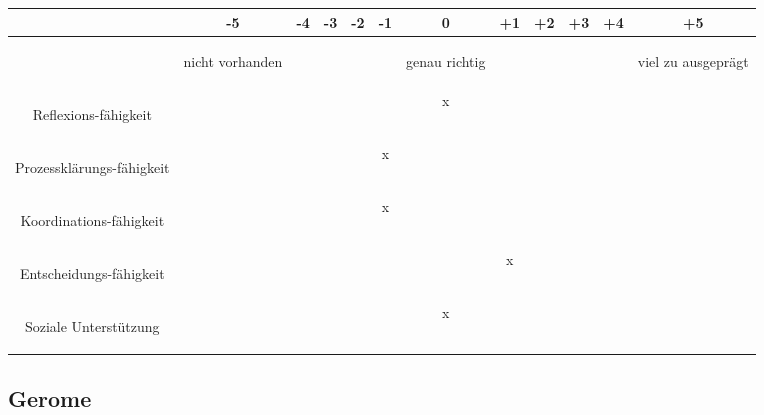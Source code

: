\begin{tabular}{C{\fabstand}|C{\abstand}|C{\abstand}|C{\abstand}|C{\abstand}|C{\abstand}|C{\abstand}|C{\abstand}|C{\abstand}|C{\abstand}|C{\abstand}|C{\abstand}|}
\hline
& -5 & -4 & -3 & -2 & -1 & 0 & +1 & +2 & +3 & +4 & +5\\
\hline
&\begin{tiny}nicht vorhanden \end{tiny}& & & & & \begin{tiny}genau richtig \end{tiny}& & & & & \begin{tiny}viel zu ausgeprägt\end{tiny}\\
\hline
\begin{tiny} Reflexions-fähigkeit \end{tiny} & & & & & & x & & & & & \\
\hline
\begin{tiny} Prozessklärungs-fähigkeit \end{tiny}& & & & & x & & & & & & \\
\hline
\begin{tiny} Koordinations-fähigkeit \end{tiny}& & & & & x & & & & & & \\
\hline
\begin{tiny} Entscheidungs-fähigkeit \end{tiny}& & & & & & & x & & & & \\
\hline
\begin{tiny} Soziale Unterstützung \end{tiny}& & & & & & x & & & & & \\
\hline
\end{tabular}

\subsection*{Gerome}

